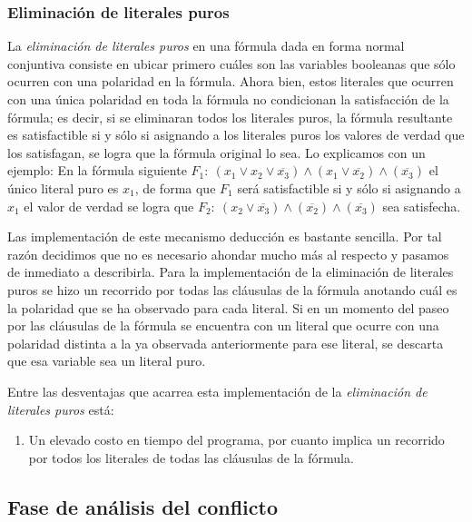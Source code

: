 \documentclass[12pt,lettersize,oneside]{article}
\begin{document}
\subsubsection{Eliminación de literales puros}

La \emph{eliminación de literales puros} en una fórmula dada en forma normal
conjuntiva consiste en ubicar primero cuáles son las variables booleanas que
sólo ocurren con una polaridad en la fórmula. Ahora bien, estos literales que
ocurren con una única polaridad en toda la fórmula no condicionan la
satisfacción de la fórmula; es decir, si se eliminaran todos los literales
puros, la fórmula resultante es satisfactible si y sólo si asignando a los
literales puros los valores de verdad que los satisfagan, se logra que la
fórmula original lo sea. Lo explicamos con un ejemplo: En la fórmula siguiente
$F_1:\ (x_1 \vee x_2 \vee \overline{x_3}) \wedge (x_1 \vee \overline{x_2})
\wedge (\overline{x_3})$ el único literal puro es $x_1$, de forma que $F_1$ será
satisfactible si y sólo si asignando a $x_1$ el valor de verdad se logra que
$F_2:\ (x_2 \vee \overline{x_3}) \wedge (\overline{x_2}) \wedge
(\overline{x_3})$ sea satisfecha.

Las implementación de este mecanismo deducción es bastante sencilla. Por tal
razón decidimos que no es necesario ahondar mucho más al respecto y pasamos de
inmediato a describirla. Para la implementación de la eliminación de literales
puros se hizo un recorrido por todas las cláusulas de la fórmula anotando cuál
es la polaridad que se ha observado para cada literal. Si en un momento del
paseo por las cláusulas de la fórmula se encuentra con un literal que ocurre con
una polaridad distinta a la ya observada anteriormente para ese literal, se
descarta que esa variable sea un literal puro.

Entre las desventajas que acarrea esta implementación de la \emph{eliminación de
literales puros} está:\vspace{-2.5mm}
\begin{enumerate}
\item Un elevado costo en tiempo del programa, por cuanto implica un recorrido
  por todos los literales de todas las cláusulas de la fórmula.
\end{enumerate}\vspace{-2.5mm}
\subsection{Fase de análisis del conflicto}
\end{document}
